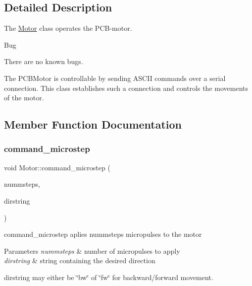 \subsection{Detailed Description}
The \hyperlink{classMotor}{Motor} class operates the P\+C\+B-\/motor. 

\begin{DoxyRefDesc}{Bug}
\item[\hyperlink{bug__bug000004}{Bug}]There are no known bugs.\end{DoxyRefDesc}


The P\+C\+B\+Motor is controllable by sending A\+S\+C\+II commands over a serial connection. This class establishes such a connection and controls the movements of the motor. 

\subsection{Member Function Documentation}
\mbox{\label{classMotor_abfbe0b96cfb97107128084ec065e31c2}} 
\subsubsection{\texorpdfstring{command\+\_\+microstep}{command\_microstep}}
{\footnotesize\ttfamily void Motor\+::command\+\_\+microstep (\begin{DoxyParamCaption}\item[{uint16\+\_\+t}]{nummsteps,  }\item[{Q\+String}]{dirstring }\end{DoxyParamCaption})\hspace{0.3cm}{\ttfamily [slot]}}



command\+\_\+microstep aplies nummsteps micropulses to the motor 


\begin{DoxyParams}{Parameters}
{\em nummsteps} & number of micropulses to apply \\
\hline
{\em dirstring} & string containing the desired direction\\
\hline
\end{DoxyParams}
dirstring may either be \char`\"{}bw\char`\"{} of \char`\"{}fw\char`\"{} for backward/forward movement. \mbox{\label{classMotor_a3d179f71c181cbeb3cdb44af166e532d}} 

